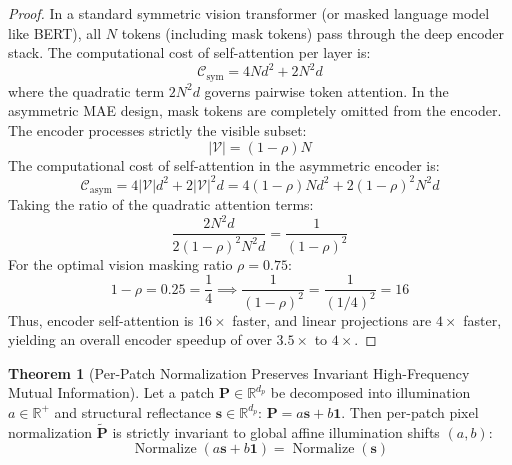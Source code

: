 \documentclass[11pt,a4paper]{article}
\theoremstyle{definition}
\newtheorem{theorem}{\textbf{Theorem}}[section]
\begin{document}
\begin{proof}
In a standard symmetric vision transformer (or masked language model like BERT), all $N$ tokens (including mask tokens) pass through the deep encoder stack.
The computational cost of self-attention per layer is:
{\boldmath
\begin{equation}
\mathcal{C}_{\text{sym}} = 4 N d^2 + 2 N^2 d
\end{equation}
}
where the quadratic term $2 N^2 d$ governs pairwise token attention.
In the asymmetric MAE design, mask tokens are completely omitted from the encoder. The encoder processes strictly the visible subset:
{\boldmath
\begin{equation}
|\mathcal{V}| = (1 - \rho) N
\end{equation}
}
The computational cost of self-attention in the asymmetric encoder is:
{\boldmath
\begin{equation}
\mathcal{C}_{\text{asym}} = 4 |\mathcal{V}| d^2 + 2 |\mathcal{V}|^2 d = 4 (1 - \rho) N d^2 + 2 (1 - \rho)^2 N^2 d
\end{equation}
}
Taking the ratio of the quadratic attention terms:
{\boldmath
\begin{equation}
\frac{2 N^2 d}{2 (1 - \rho)^2 N^2 d} = \frac{1}{(1 - \rho)^2}
\end{equation}
}
For the optimal vision masking ratio $\rho = 0.75$:
{\boldmath
\begin{equation}
1 - \rho = 0.25 = \frac{1}{4} \implies \frac{1}{(1 - \rho)^2} = \frac{1}{(1/4)^2} = 16
\end{equation}
}
Thus, encoder self-attention is $16\times$ faster, and linear projections are $4\times$ faster, yielding an overall encoder speedup of over $3.5\times$ to $4\times$.
\end{proof}

\begin{theorem}[Per-Patch Normalization Preserves Invariant High-Frequency Mutual Information]
Let a patch $\mathbf{P} \in \mathbb{R}^{d_p}$ be decomposed into illumination $a \in \mathbb{R}^+$ and structural reflectance $\mathbf{s} \in \mathbb{R}^{d_p}$: $\mathbf{P} = a \mathbf{s} + b \mathbf{1}$. Then per-patch pixel normalization $\tilde{\mathbf{P}}$ is strictly invariant to global affine illumination shifts $(a, b)$:
{\boldmath
\begin{equation}
\operatorname{Normalize}(a \mathbf{s} + b \mathbf{1}) = \operatorname{Normalize}(\mathbf{s})
\end{equation}
}
\end{theorem}
\end{document}
